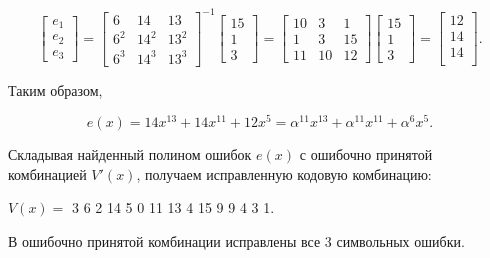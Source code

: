\begin{equation*}
  \begin{bmatrix}
    e_1\\
    e_2\\
    e_3
  \end{bmatrix} = 
  \begin{bmatrix}
    6 & 14 & 13 \\
    6^2 & 14^2 & 13^2\\
    6^3 & 14^3 & 13^3
  \end{bmatrix}^{-1}
  \begin{bmatrix}
    15\\
    1\\
    3
  \end{bmatrix} =
  \begin{bmatrix}
    10 & 3 & 1 \\
    1 & 3 & 15 \\
    11 & 10 & 12
  \end{bmatrix}
  \begin{bmatrix}
    15\\
    1\\
    3
  \end{bmatrix} =
  \begin{bmatrix}
    12\\
    14\\
    14\\
  \end{bmatrix}.
\end{equation*}

Таким образом,

\begin{equation*}
  e(x) = 14x^{13} + 14x^{11} + 12x^{5} = \alpha^{11}x^{13} +
  \alpha^{11}x^{11} + \alpha^6x^5.
\end{equation*}

Складывая найденный полином ошибок $e(x)$ с ошибочно принятой
комбинацией $V'(x)$, получаем исправленную кодовую комбинацию:

\begin{center}
  $V(x) = $ 3 6 2 14 5 0 11 13 4 15 9 9 4 3 1.
\end{center}


В ошибочно принятой комбинации исправлены все 3 символьных ошибки.




